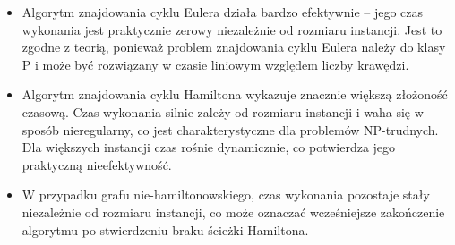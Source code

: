 \documentclass{article}
\begin{document}
	\begin{itemize}
		\item Algorytm znajdowania cyklu Eulera działa bardzo efektywnie – jego czas wykonania jest praktycznie zerowy niezależnie od rozmiaru instancji. Jest to zgodne z teorią, ponieważ problem znajdowania cyklu Eulera należy do klasy P i może być rozwiązany w czasie liniowym względem liczby krawędzi.
		
		\item Algorytm znajdowania cyklu Hamiltona wykazuje znacznie większą złożoność czasową. Czas wykonania silnie zależy od rozmiaru instancji i waha się w sposób nieregularny, co jest charakterystyczne dla problemów NP-trudnych. Dla większych instancji czas rośnie dynamicznie, co potwierdza jego praktyczną nieefektywność.
		
		\item W przypadku grafu nie-hamiltonowskiego, czas wykonania pozostaje stały niezależnie od rozmiaru instancji, co może oznaczać wcześniejsze zakończenie algorytmu po stwierdzeniu braku ścieżki Hamiltona.
	\end{itemize}
	
\end{document}
